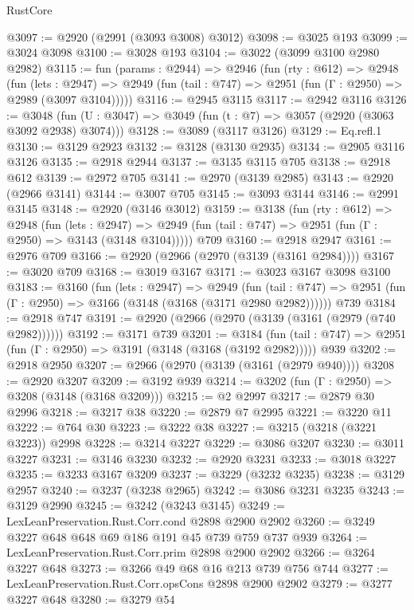 \begin{lexlean}{RustCore}
\begin{coremodule}
@3097 := @2920 (@2991 (@3093 @3008) @3012)
@3098 := @3025 @193
@3099 := @3024 @3098
@3100 := @3028 @193
@3104 := @3022 (@3099 @3100 @2980 @2982)
@3115 := fun (params : @2944) =>
  @2946
    (fun (rty : @612) =>
    @2948
      (fun (lets : @2947) =>
      @2949 (fun (tail : @747) => @2951 (fun (Γ : @2950) => @2989 (@3097 @3104)))))
@3116 := @2945 @3115
@3117 := @2942 @3116
@3126 := @3048 (fun (U : @3047) => @3049 (fun (t : @7) => @3057 (@2920 (@3063 @3092 @2938) @3074)))
@3128 := @3089 (@3117 @3126)
@3129 := Eq.refl.{1}
@3130 := @3129 @2923
@3132 := @3128 (@3130 @2935)
@3134 := @2905 @3116 @3126
@3135 := @2918 @2944
@3137 := @3135 @3115 @705
@3138 := @2918 @612
@3139 := @2972 @705
@3141 := @2970 (@3139 @2985)
@3143 := @2920 (@2966 @3141)
@3144 := @3007 @705
@3145 := @3093 @3144
@3146 := @2991 @3145
@3148 := @2920 (@3146 @3012)
@3159 := @3138
    (fun (rty : @612) =>
    @2948
      (fun (lets : @2947) =>
      @2949 (fun (tail : @747) => @2951 (fun (Γ : @2950) => @3143 (@3148 @3104)))))
    @709
@3160 := @2918 @2947
@3161 := @2976 @709
@3166 := @2920 (@2966 (@2970 (@3139 (@3161 @2984))))
@3167 := @3020 @709
@3168 := @3019 @3167
@3171 := @3023 @3167 @3098 @3100
@3183 := @3160
    (fun (lets : @2947) =>
    @2949
      (fun (tail : @747) => @2951 (fun (Γ : @2950) => @3166 (@3148 (@3168 (@3171 @2980 @2982))))))
    @739
@3184 := @2918 @747
@3191 := @2920 (@2966 (@2970 (@3139 (@3161 (@2979 (@740 @2982))))))
@3192 := @3171 @739
@3201 := @3184
    (fun (tail : @747) => @2951 (fun (Γ : @2950) => @3191 (@3148 (@3168 (@3192 @2982)))))
    @939
@3202 := @2918 @2950
@3207 := @2966 (@2970 (@3139 (@3161 (@2979 @940))))
@3208 := @2920 @3207
@3209 := @3192 @939
@3214 := @3202 (fun (Γ : @2950) => @3208 (@3148 (@3168 @3209)))
@3215 := @2 @2997
@3217 := @2879 @30 @2996
@3218 := @3217 @38
@3220 := @2879 @7 @2995
@3221 := @3220 @11
@3222 := @764 @30
@3223 := @3222 @38
@3227 := @3215 (@3218 (@3221 @3223)) @2998
@3228 := @3214 @3227
@3229 := @3086 @3207
@3230 := @3011 @3227
@3231 := @3146 @3230
@3232 := @2920 @3231
@3233 := @3018 @3227
@3235 := @3233 @3167 @3209
@3237 := @3229 (@3232 @3235)
@3238 := @3129 @2957
@3240 := @3237 (@3238 @2965)
@3242 := @3086 @3231 @3235
@3243 := @3129 @2990
@3245 := @3242 (@3243 @3145)
@3249 := LexLeanPreservation.Rust.Corr.cond @2898 @2900 @2902
@3260 := @3249 @3227 @648 @648 @69 @186 @191 @45 @739 @759 @737 @939
@3264 := LexLeanPreservation.Rust.Corr.prim @2898 @2900 @2902
@3266 := @3264 @3227 @648
@3273 := @3266 @49 @68 @16 @213 @739 @756 @744
@3277 := LexLeanPreservation.Rust.Corr.opsCons @2898 @2900 @2902
@3279 := @3277 @3227 @648
@3280 := @3279 @54

\end{coremodule}
\end{lexlean}
